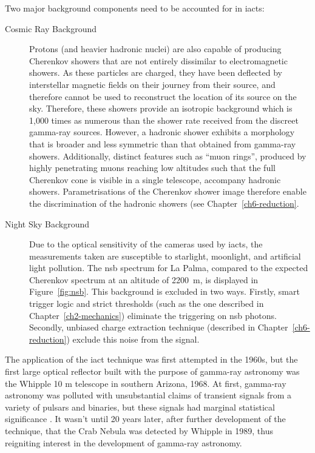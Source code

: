 Two major background components need to be accounted for in \glspl{iact}:
\begin{description}
\item [Cosmic Ray Background] Protons (and heavier hadronic nuclei) are also capable of producing Cherenkov showers that are not entirely dissimilar to electromagnetic showers. As these particles are charged, they have been deflected by interstellar magnetic fields on their journey from their source, and therefore cannot be used to reconstruct the location of its source on the sky. Therefore, these showers provide an isotropic background which is 1,000 times as numerous than the shower rate received from the discreet gamma-ray sources. However, a hadronic shower exhibits a morphology that is broader and less symmetric than that obtained from gamma-ray showers. Additionally, distinct features such as ``muon rings'', produced by highly penetrating muons reaching low altitudes such that the full Cherenkov cone is visible in a single telescope, accompany hadronic showers. Parametrisations of the Cherenkov shower image therefore enable the discrimination of the hadronic showers (see Chapter~\ref{ch6-reduction}.
\item [Night Sky Background] Due to the optical sensitivity of the cameras used by \glspl{iact}, the measurements taken are susceptible to starlight, moonlight, and artificial light pollution. The \gls{nsb} spectrum for La Palma, compared to the expected Cherenkov spectrum at an altitude of \SI{2200}{m}, is displayed in Figure~\ref{fig:nsb}. This background is excluded in two ways. Firstly, smart trigger logic and strict thresholds (such as the one described in Chapter~\ref{ch2-mechanics}) eliminate the triggering on \gls{nsb} photons. Secondly, unbiased charge extraction technique (described in Chapter~\ref{ch6-reduction}) exclude this noise from the signal.
\end{description}

The application of the \gls{iact} technique was first attempted in the 1960s, but the first large optical reflector built with the purpose of gamma-ray astronomy was the Whipple 10 m telescope in southern Arizona, 1968. At first, gamma-ray astronomy was polluted with unsubstantial claims of transient signals from a variety of pulsars and binaries, but these signals had marginal statistical significance \cite[][p.~9]{Weekes2003}. It wasn't until 20 years later, after further development of the technique, that the Crab Nebula was detected by Whipple in 1989, thus reigniting interest in the development of gamma-ray astronomy.

